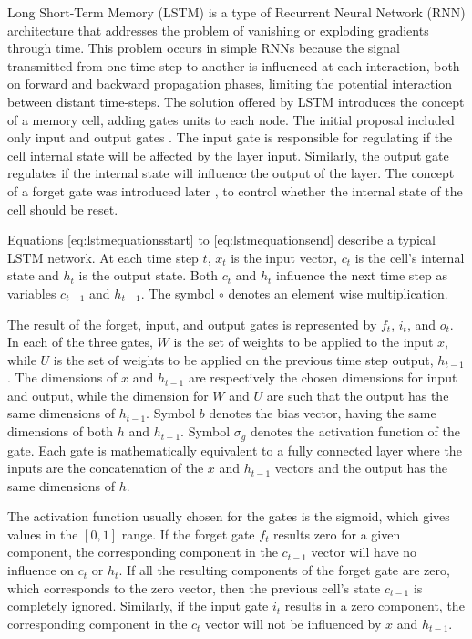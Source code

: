 Long Short-Term Memory \cite{hochreiter_long_1997} (LSTM) is a type of Recurrent Neural Network (RNN) architecture that addresses the problem of vanishing or exploding gradients through time. This problem occurs in simple RNNs because the signal transmitted from one time-step to another is influenced at each interaction, both on forward and backward propagation phases, limiting the potential interaction between distant time-steps. The solution offered by LSTM introduces the concept of a memory cell, adding gates units to each node. The initial proposal included only input and output gates \cite{hochreiter_long_1997}.
The input gate is responsible for regulating if the cell internal state will be affected by the layer input. Similarly, the output gate regulates if the internal state will influence the output of the layer. The concept of a forget gate was introduced later \cite{gers_learning_1999}, to control whether the internal state of the cell should be reset.

Equations \ref{eq:lstmequationsstart} to \ref{eq:lstmequationsend} describe a typical LSTM network. At each time step $t$, $x_t$ is the input vector, $c_t$ is the cell's internal state and $h_t$ is the output state. Both $c_t$ and $h_t$ influence the next time step as variables $c_{t-1}$ and $h_{t-1}$. The symbol $\circ$ denotes an element wise multiplication.

The result of the forget, input, and output gates is represented by $f_t$, $i_t$, and $o_t$.
In each of the three gates, $W$ is the set of weights to be applied to the input $x$, while $U$ is the set of weights to be applied on the previous time step output, $h_{t-1}$. 
The dimensions of $x$ and $h_{t-1}$ are respectively the chosen dimensions for input and output, while the dimension for $W$ and $U$ are such that the output has the same dimensions of $h_{t-1}$.  Symbol $b$ denotes the bias vector, having the same dimensions of both $h$ and $h_{t-1}$. Symbol $\sigma_g$ denotes the activation function of the gate. Each gate is mathematically equivalent to a fully connected layer where the inputs are the concatenation of the $x$ and $h_{t-1}$ vectors and the output has the same dimensions of $h$.

The activation function usually chosen for the gates is the sigmoid, which gives values in the $[0,1]$ range. If the forget gate $f_t$ results zero for a given component, the corresponding component in the $c_{t-1}$ vector will have no influence on $c_t$ or $h_t$. If all the resulting components of the forget gate are zero, which corresponds to the zero vector, then the previous cell's state $c_{t-1}$ is completely ignored.
Similarly, if the input gate $i_t$ results in a zero component, the corresponding component in the $c_t$ vector will not be influenced by $x$ and $h_{t-1}$.

